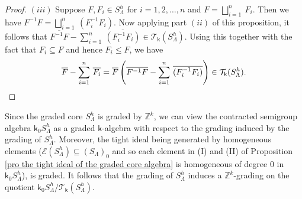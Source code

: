 \documentclass[a4paper,reqno,11pt]{amsart}
\numberwithin{equation}{section}
\theoremstyle{definition}
\theoremstyle{remark}
\begin{document}
\begin{proof}
$(iii)$ Suppose $F,F_i\in S_\Lambda^h$ for $i=1,2,\ldots,n$ and $F=\displaystyle{\bigsqcup_{i=1}^{n}}~F_i$. Then we have $F^{-1}F=\displaystyle{\bigsqcup_{i=1}^{n}}~(F_i^{-1}F_i)$. Now applying part $(ii)$ of this proposition, it follows that $\overline{F^{-1}F}-\displaystyle{\sum_{i=1}^{n}}~\overline{(F_i^{-1}F_i)}\in \mathcal{T}_\mathsf{k}(S_\Lambda^h)$. Using this together with the fact that $F_i\subseteq F$ and hence $F_i\le F$, we have \[\overline{F}-\displaystyle{\sum_{i=1}^{n}}~\overline{F_i}=\overline{F}\left(\overline{F^{-1}F}-\displaystyle{\sum_{i=1}^{n}}~\overline{(F_i^{-1}F_i)}\right)\in \mathcal{T}_\mathsf{k}(S_\Lambda^h).\qedhere\]
\end{proof}
Since the graded core $S_\Lambda^h$ is graded by $\mathbb{Z}^k$, we can view the contracted semigroup algebra $\mathsf{k}_0S_\Lambda^h$ as a graded $\mathsf{k}$-algebra with respect to the grading induced by the grading of $S_\Lambda^h$. Moreover, the tight ideal being generated by homogeneous elements ($\mathcal{E}(S_\Lambda^h)\subseteq (S_\Lambda)_0$ and so each element in (I) and (II) of Proposition \ref{pro the tight ideal of the graded core algebra} is homogeneous of degree $0$ in $\mathsf{k}_0S_\Lambda^h$), is graded. It follows that the grading of $S_\Lambda^h$ induces a $\mathbb{Z}^k$-grading on the quotient $\mathsf{k}_0S_\Lambda^h/{\mathcal{T}_\mathsf{k}(S_\Lambda^h)}$.  
\end{document}
